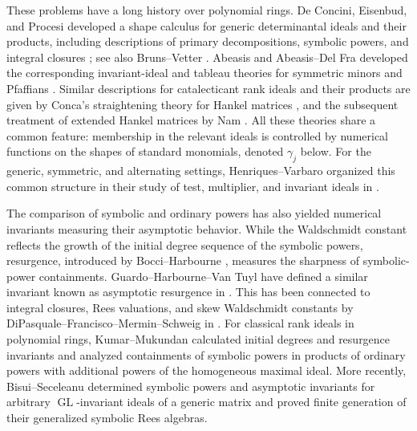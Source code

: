 \documentclass[11pt,reqno]{amsart}
\numberwithin{equation}{subsection}
\theoremstyle{definition}
\theoremstyle{remark}
\DeclareMathOperator{\GL}{GL}
\begin{document}
These problems have a long history over polynomial rings. De Concini, Eisenbud, and Procesi developed a shape calculus for generic determinantal ideals and their products, including descriptions of primary decompositions, symbolic powers, and integral closures \cite{DEP}; see also Bruns--Vetter \cite{BrunsVetter}.
Abeasis and Abeasis--Del Fra developed the corresponding
invariant-ideal and tableau theories for symmetric minors and Pfaffians \cite{Abeasis,AbeasisDelFra}. Similar descriptions for catalecticant rank ideals and their products are given by Conca's straightening theory for Hankel matrices \cite{ConcaHankel}, and the subsequent treatment of extended Hankel matrices by Nam \cite{Nam}. All these theories share a common feature: membership in the relevant ideals is controlled by numerical functions on the shapes of standard monomials, denoted $\gamma_j$ below. For the generic, symmetric, and alternating settings, Henriques--Varbaro organized this common structure in their study of test, multiplier, and invariant ideals in  \cite{HenriquesVarbaro}.

The comparison of symbolic and ordinary powers has also yielded numerical invariants measuring their asymptotic behavior. While the Waldschmidt constant reflects the growth of the initial degree sequence of the symbolic powers,  resurgence, introduced by Bocci--Harbourne \cite{BocciHarbourne}, measures the sharpness of symbolic-power containments. Guardo--Harbourne--Van Tuyl have defined a similar invariant known as asymptotic resurgence in \cite{GuardoHarbourneVanTuyl2013}. This has been connected  to integral closures, Rees valuations, and skew Waldschmidt constants by DiPasquale--Francisco--Mermin--Schweig in \cite{DFMS}.
For classical rank ideals in polynomial rings, Kumar--Mukundan \cite{KumarMukundan} calculated initial degrees and resurgence invariants and analyzed containments of symbolic powers in products of ordinary powers with additional powers of the homogeneous maximal ideal. More recently, Bisui--Seceleanu
\cite{BisuiSeceleanu2026} determined symbolic powers and asymptotic invariants for arbitrary $\GL$-invariant ideals of a generic matrix and proved finite generation of their generalized symbolic Rees algebras.
\end{document}
